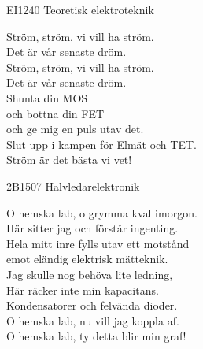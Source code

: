 \documentclass[a6paper, 10pt, twoside]{article}
\begin{document}
\noindent
\begin{center}
\footnotesize EI1240 Teoretisk elektroteknik\\
\end{center}
\begin{lyrics}
Ström, ström, vi vill ha ström. \\
Det är vår senaste dröm. \\
Ström, ström, vi vill ha ström. \\
Det är vår senaste dröm. 
\vspace{5pt} \\
Shunta din MOS \\
och bottna din FET \\
och ge mig en puls utav det. \\
Slut upp i kampen för Elmät och TET. \\
Ström är det bästa vi vet! 
\end{lyrics}
\vspace{20pt} 
\begin{center}
\footnotesize2B1507 Halvledarelektronik\\
\end{center}
\begin{lyrics}
O hemska lab, o grymma kval imorgon. \\
Här sitter jag och förstår ingenting. \\
Hela mitt inre fylls utav ett motstånd \\
emot eländig elektrisk mätteknik. 
\vspace{5pt} \\
Jag skulle nog behöva lite ledning, \\
Här räcker inte min kapacitans. 
\vspace{5pt} \\
Kondensatorer och felvända dioder. \\
O hemska lab, nu vill jag koppla af. \\
O hemska lab, ty detta blir min graf! 
\end{lyrics}

\newpage
\noindent
\end{document}

